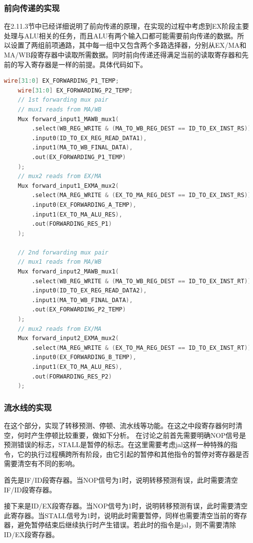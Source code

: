 \subsubsection{前向传递的实现}
在2.11.3节中已经详细说明了前向传递的原理，在实现的过程中考虑到EX阶段主要处理与ALU相关的任务，而且ALU有两个输入口都可能需要前向传递的数据。所以设置了两组前项通路，其中每一组中又包含两个多路选择器，分别从EX/MA和MA/WB段寄存器中读取所需数据。同时前向传递还得满足当前的读取寄存器和先前的写入寄存器是一样的前提。具体代码如下。
\begin{lstlisting}[language=Verilog]
    wire[31:0] EX_FORWARDING_P1_TEMP;
    wire[31:0] EX_FORWARDING_P2_TEMP;
    // 1st forwarding mux pair 
    // mux1 reads from MA/WB
    Mux forward_input1_MAWB_mux1(
        .select(WB_REG_WRITE & (MA_TO_WB_REG_DEST == ID_TO_EX_INST_RS)),
        .input0(ID_TO_EX_REG_READ_DATA1),
        .input1(MA_TO_WB_FINAL_DATA),
        .out(EX_FORWARDING_P1_TEMP)
    );
    // mux2 reads from EX/MA
    Mux forward_input1_EXMA_mux2(
        .select(MA_REG_WRITE & (EX_TO_MA_REG_DEST == ID_TO_EX_INST_RS)),
        .input0(EX_FORWARDING_A_TEMP),
        .input1(EX_TO_MA_ALU_RES),
        .out(FORWARDING_RES_P1)
    );
    
    // 2nd forwarding mux pair 
    // mux1 reads from MA/WB
    Mux forward_input2_MAWB_mux1(
        .select(WB_REG_WRITE & (MA_TO_WB_REG_DEST == ID_TO_EX_INST_RT)),
        .input0(ID_TO_EX_REG_READ_DATA2),
        .input1(MA_TO_WB_FINAL_DATA),
        .out(EX_FORWARDING_P2_TEMP)
    );
    // mux2 reads from EX/MA
    Mux forward_input2_EXMA_mux2(
        .select(MA_REG_WRITE & (EX_TO_MA_REG_DEST == ID_TO_EX_INST_RT)),
        .input0(EX_FORWARDING_B_TEMP),
        .input1(EX_TO_MA_ALU_RES),
        .out(FORWARDING_RES_P2)
    );
\end{lstlisting}

\subsubsection{流水线的实现}
在这个部分，实现了转移预测、停顿、流水线等功能。在这之中段寄存器何时清空，何时产生停顿比较重要，做如下分析。
在讨论之前首先需要明确NOP信号是预测错误的标志，STALL是暂停的标志。在这里需要考虑jal这样一种特殊的指令，它的执行过程横跨所有阶段，由它引起的暂停和其他指令的暂停对寄存器是否需要清空有不同的影响。

首先是IF/ID段寄存器。当NOP信号为1时，说明转移预测有误，此时需要清空IF/ID段寄存器。

接下来是ID/EX段寄存器。当NOP信号为1时，说明转移预测有误，此时需要清空此寄存器。当STALL信号为1时，说明此时需要暂停，同样也需要清空当前的寄存器，避免暂停结束后继续执行时产生错误。若此时的指令是jal，则不需要清除ID/EX段寄存器。

